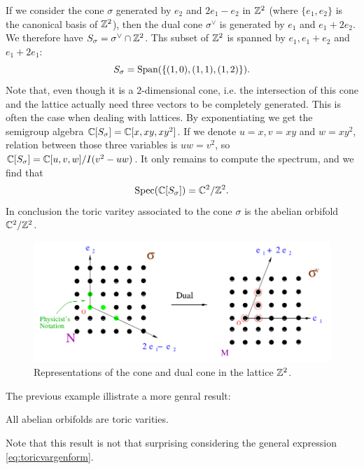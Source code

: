             \begin{examp*}
                If we consider the cone $\sigma$ generated by $e_2$ and $2e_1-e_2$ in $\mathbb{Z}^2$ (where $\{e_1,e_2\}$ is the canonical basis of $\mathbb{Z}^2$), then the dual cone $\sigma^\vee$ is generated by $e_1$ and $e_1+2e_2$. We therefore have $S_\sigma=\sigma^\vee\cap\mathbb{Z}^2$. Ths subset of $\mathbb{Z}^2$ is spanned by $e_1,e_1+e_2$ and $e_1+2e_1$:
                \begin{equation}
                    S_\sigma=\text{Span}(\{(1,0),(1,1),(1,2)\}).
                \end{equation}
                Note that, even though it is a $2$-dimensional cone, i.e. the intersection of this cone and the lattice actually need three vectors to be completely generated. This is often the case when dealing with lattices.
                By exponentiating we get the semigroup algebra $\mathbb{C}[S_\sigma]=\mathbb{C}[x,xy,xy^2]$. If we denote $u=x,v=xy$ and $w=xy^2$, relation between those three variables is $uw=v^2$, so $\mathbb{C}[S_\sigma]=\mathbb{C}[u,v,w]/I(v^2-uw)$. It only remains to compute the spectrum, and we find that
                \begin{equation}
                    \text{Spec}(\mathbb{C}[S_\sigma])=\mathbb{C}^2/\mathbb{Z}^2.
                \end{equation}
                In conclusion the toric varitey associated to the cone $\sigma$ is the abelian orbifold $\mathbb{C}^2/\mathbb{Z}^2$.
            \end{examp*}
            \begin{figure}[H]
                \centering
                \includegraphics[scale=0.4]{Pictures/toricdiagZ2orbifold.png}
                \caption{Representations of the cone and dual cone in the lattice $\mathbb{Z}^2$.}
            \end{figure}

            The previous example illistrate a more genral result:
            \begin{prop*}
                All abelian orbifolds are toric varities.
            \end{prop*}
            Note that this result is not that surprising considering the general expression \eqref{eq:toricvargenform}.


